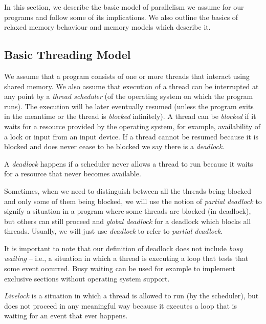 In this section, we describe the basic model of parallelism we assume for our
programs and follow some of its implications.
We also outline the basics of relaxed memory behaviour and memory models
which describe it.

\subsection{Basic Threading Model}

We assume that a program consists of one or more threads that interact using
shared memory.
We also assume that execution of a thread can be interrupted at any point by a
\emph{thread scheduler} (of the operating system on which the program runs).
The execution will be later eventually resumed (unless the program exits in the meantime or the thread is \emph{blocked} infinitely).
A thread can be \emph{blocked} if it waits for a resource provided by the
operating system, for example, availability of a lock or input from an input
device.
If a thread cannot be resumed because it is blocked and does never cease to be
blocked we say there is a \emph{deadlock}.

\begin{definition}\label{def:deadlock}
    A \emph{deadlock} happens if a scheduler never allows a thread to run
    because it waits for a resource that never becomes available.

    Sometimes, when we need to distinguish between all the threads being
    blocked and only some of them being blocked, we will use the notion of
    \emph{partial deadlock} to signify a situation in a program where some
    threads are blocked (in deadlock), but others can still proceed and
    \emph{global deadlock} for a deadlock which blocks all threads.
    Usually, we will just use \emph{deadlock} to refer to \emph{partial deadlock}.
\end{definition}

It is important to note that our definition of deadlock does not include
\emph{busy waiting} -- i.e., a situation in which a thread is executing a loop
that tests that some event occurred.
Busy waiting can be used for example to implement exclusive sections without
operating system support.

\begin{definition}[Livelock]\label{def:livelock}
    \emph{Livelock} is a situation in which a thread is allowed to run (by
    the scheduler), but does not proceed in any meaningful way because it
    executes a loop that is waiting for an event that ever happens.
\end{definition}

